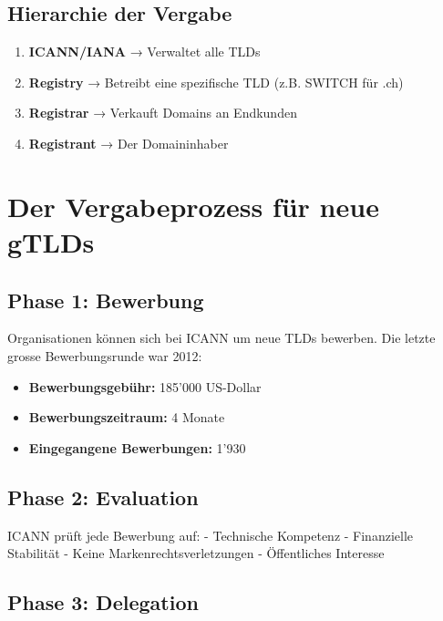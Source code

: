 \documentclass[
  nswissgerman,
  a4paper,
  DIV=11,
  numbers=noendperiod,
  ngerman]{scrreprt}
\providecommand{\tightlist}{%
  \setlength{\itemsep}{0pt}\setlength{\parskip}{0pt}}
\begin{document}
\subsection{Hierarchie der Vergabe}\label{hierarchie-der-vergabe}

\begin{enumerate}
\def\labelenumi{\arabic{enumi}.}
\tightlist
\item
  \textbf{ICANN/IANA} → Verwaltet alle TLDs
\item
  \textbf{Registry} → Betreibt eine spezifische TLD (z.B. SWITCH für
  .ch)
\item
  \textbf{Registrar} → Verkauft Domains an Endkunden
\item
  \textbf{Registrant} → Der Domaininhaber
\end{enumerate}

\section{Der Vergabeprozess für neue
gTLDs}\label{der-vergabeprozess-fuxfcr-neue-gtlds}

\subsection{Phase 1: Bewerbung}\label{phase-1-bewerbung}

Organisationen können sich bei ICANN um neue TLDs bewerben. Die letzte
grosse Bewerbungsrunde war 2012:

\begin{itemize}
\tightlist
\item
  \textbf{Bewerbungsgebühr:} 185'000 US-Dollar
\item
  \textbf{Bewerbungszeitraum:} 4 Monate
\item
  \textbf{Eingegangene Bewerbungen:} 1'930
\end{itemize}

\subsection{Phase 2: Evaluation}\label{phase-2-evaluation}

ICANN prüft jede Bewerbung auf: - Technische Kompetenz - Finanzielle
Stabilität - Keine Markenrechtsverletzungen - Öffentliches Interesse

\subsection{Phase 3: Delegation}\label{phase-3-delegation}
\end{document}
